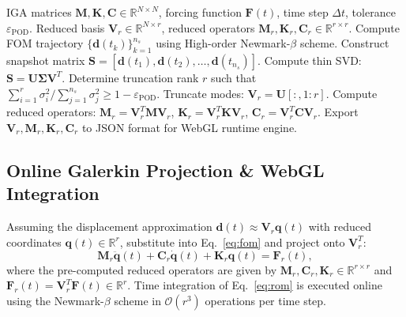 \begin{algorithm}[h]
\caption{Offline IGA-POD Reduced Basis Generation}
\label{alg:offline_pod}
\begin{algorithmic}[1]
\Require IGA matrices $\bm{M}, \bm{K}, \bm{C} \in \mathbb{R}^{N \times N}$, forcing function $\bm{F}(t)$, time step $\Delta t$, tolerance $\varepsilon_{\text{POD}}$.
\Ensure Reduced basis $\bm{V}_r \in \mathbb{R}^{N \times r}$, reduced operators $\bm{M}_r, \bm{K}_r, \bm{C}_r \in \mathbb{R}^{r \times r}$.
\State Compute FOM trajectory $\{\bm{d}(t_k)\}_{k=1}^{n_s}$ using High-order Newmark-$\beta$ scheme.
\State Construct snapshot matrix $\bm{S} = [\bm{d}(t_1), \bm{d}(t_2), \dots, \bm{d}(t_{n_s})]$.
\State Compute thin SVD: $\bm{S} = \bm{U} \bm{\Sigma} \bm{V}^T$.
\State Determine truncation rank $r$ such that $\sum_{i=1}^r \sigma_i^2 / \sum_{j=1}^{n_s} \sigma_j^2 \ge 1 - \varepsilon_{\text{POD}}$.
\State Truncate modes: $\bm{V}_r = \bm{U}[:, 1:r]$.
\State Compute reduced operators: $\bm{M}_r = \bm{V}_r^T \bm{M} \bm{V}_r$, $\bm{K}_r = \bm{V}_r^T \bm{K} \bm{V}_r$, $\bm{C}_r = \bm{V}_r^T \bm{C} \bm{V}_r$.
\State Export $\bm{V}_r, \bm{M}_r, \bm{K}_r, \bm{C}_r$ to JSON format for WebGL runtime engine.
\end{algorithmic}
\end{algorithm}

\subsection{Online Galerkin Projection \& WebGL Integration}
Assuming the displacement approximation $\bm{d}(t) \approx \bm{V}_r \bm{q}(t)$ with reduced coordinates $\bm{q}(t) \in \mathbb{R}^r$, substitute into Eq.~\eqref{eq:fom} and project onto $\bm{V}_r^T$:
\begin{equation}
    \bm{M}_r \ddot{\bm{q}}(t) + \bm{C}_r \dot{\bm{q}}(t) + \bm{K}_r \bm{q}(t) = \bm{F}_r(t),
    \label{eq:rom}
\end{equation}
where the pre-computed reduced operators are given by $\bm{M}_r, \bm{C}_r, \bm{K}_r \in \mathbb{R}^{r \times r}$ and $\bm{F}_r(t) = \bm{V}_r^T \bm{F}(t) \in \mathbb{R}^r$. Time integration of Eq.~\eqref{eq:rom} is executed online using the Newmark-$\beta$ scheme in $\mathcal{O}(r^3)$ operations per time step.

